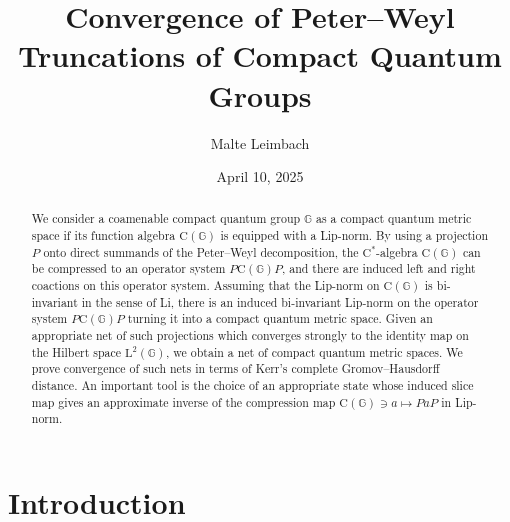 \documentclass{amsart}
\title[Peter--Weyl truncations of compact quantum groups]{Convergence of Peter--Weyl Truncations of Compact Quantum Groups}
\author{Malte Leimbach}
\date{April 10, 2025}
\theoremstyle{plain}
\theoremstyle{definition}
\theoremstyle{remark}
\begin{document}
	
	\begin{abstract}
		We consider a coamenable compact quantum group $\mathbb{G}$ as a compact quantum metric space if its function algebra $\mathrm{C}(\mathbb{G})$ is equipped with a Lip-norm.
		By using a projection $P$ onto direct summands of the Peter--Weyl decomposition, the $\mathrm{C}^*$-algebra $\mathrm{C}(\mathbb{G})$ can be compressed to an operator system $P\mathrm{C}(\mathbb{G})P$, and there are induced left and right coactions on this operator system.
		Assuming that the Lip-norm on $\mathrm{C}(\mathbb{G})$ is bi-invariant in the sense of Li, there is an induced bi-invariant Lip-norm on the operator system $P\mathrm{C}(\mathbb{G})P$ turning it into a compact quantum metric space.
		Given an appropriate net of such projections which converges strongly to the identity map on the Hilbert space $\mathrm{L}^2(\mathbb{G})$, we obtain a net of compact quantum metric spaces.
		We prove convergence of such nets in terms of Kerr's complete Gromov--Hausdorff distance.
		An important tool is the choice of an appropriate state whose induced slice map gives an approximate inverse of the compression map $\mathrm{C}(\mathbb{G}) \ni a \mapsto PaP$ in Lip-norm.
	\end{abstract}
	
	\maketitle
	
	\tableofcontents
	
	
	\section{Introduction}
	
\end{document}
